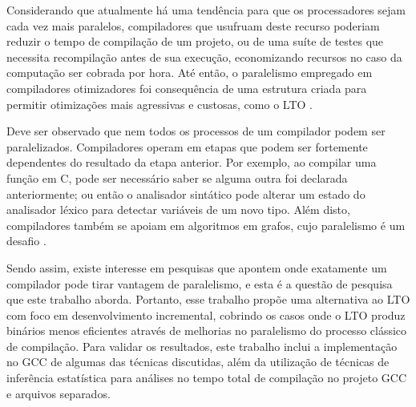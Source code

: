 Considerando que atualmente há uma tendência para que os processadores sejam
cada vez mais paralelos, compiladores que usufruam deste recurso poderiam
reduzir o tempo de compilação de um projeto, ou de uma suíte de testes que
necessita recompilação antes de sua execução, economizando recursos no caso da
computação ser cobrada por hora. Até então, o paralelismo empregado em compiladores
otimizadores foi consequência de uma estrutura criada para permitir otimizações
mais agressivas e custosas, como o LTO \citep{glek2010optimizing}.

Deve ser observado que nem todos os processos de um compilador podem ser
paralelizados. Compiladores operam em etapas que podem ser fortemente
dependentes do resultado da etapa anterior. Por exemplo, ao compilar uma
função em C, pode ser necessário saber se alguma outra foi declarada anteriormente; ou
então o analisador sintático pode alterar um estado do analisador léxico para
detectar variáveis de um novo tipo. Além disto, compiladores também se apoiam em algoritmos
em grafos, cujo paralelismo é um desafio \citep{lumsdaine2007challenges}.

Sendo assim, existe interesse em pesquisas que apontem onde exatamente um compilador
pode tirar vantagem de paralelismo, e esta é a questão de pesquisa que este
trabalho aborda. Portanto, esse trabalho propõe uma alternativa ao LTO com foco
em desenvolvimento incremental, cobrindo os casos onde o LTO produz binários menos
eficientes através de melhorias no paralelismo do processo clássico de compilação.
Para validar os resultados, este trabalho inclui a implementação no GCC de algumas das
técnicas discutidas, além da utilização de técnicas de inferência estatística para
análises no tempo total de compilação no projeto GCC e arquivos separados.
